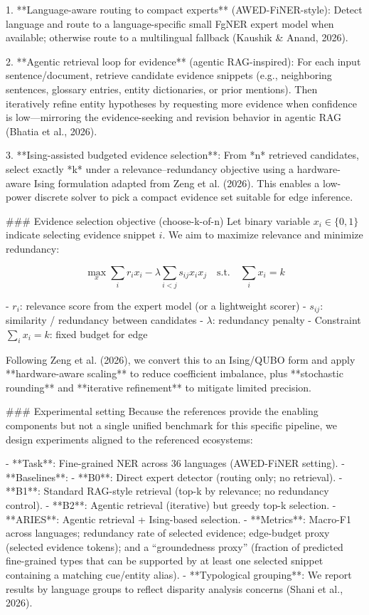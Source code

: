 1. **Language-aware routing to compact experts** (AWED-FiNER-style):  
   Detect language and route to a language-specific small FgNER expert model when available; otherwise route to a multilingual fallback (Kaushik & Anand, 2026).

2. **Agentic retrieval loop for evidence** (agentic RAG-inspired):  
   For each input sentence/document, retrieve candidate evidence snippets (e.g., neighboring sentences, glossary entries, entity dictionaries, or prior mentions). Then iteratively refine entity hypotheses by requesting more evidence when confidence is low—mirroring the evidence-seeking and revision behavior in agentic RAG (Bhatia et al., 2026).

3. **Ising-assisted budgeted evidence selection**:  
   From *n* retrieved candidates, select exactly *k* under a relevance–redundancy objective using a hardware-aware Ising formulation adapted from Zeng et al. (2026). This enables a low-power discrete solver to pick a compact evidence set suitable for edge inference.

### Evidence selection objective (choose-k-of-n)  
Let binary variable \(x_i \in \{0,1\}\) indicate selecting evidence snippet \(i\). We aim to maximize relevance and minimize redundancy:

\[
\max_{x} \sum_i r_i x_i - \lambda \sum_{i<j} s_{ij} x_i x_j
\quad \text{s.t.} \quad \sum_i x_i = k
\]

- \(r_i\): relevance score from the expert model (or a lightweight scorer)  
- \(s_{ij}\): similarity / redundancy between candidates  
- \(\lambda\): redundancy penalty  
- Constraint \(\sum_i x_i = k\): fixed budget for edge

Following Zeng et al. (2026), we convert this to an Ising/QUBO form and apply **hardware-aware scaling** to reduce coefficient imbalance, plus **stochastic rounding** and **iterative refinement** to mitigate limited precision.

### Experimental setting  
Because the references provide the enabling components but not a single unified benchmark for this specific pipeline, we design experiments aligned to the referenced ecosystems:

- **Task**: Fine-grained NER across 36 languages (AWED-FiNER setting).  
- **Baselines**:  
  - **B0**: Direct expert detector (routing only; no retrieval).  
  - **B1**: Standard RAG-style retrieval (top-k by relevance; no redundancy control).  
  - **B2**: Agentic retrieval (iterative) but greedy top-k selection.  
  - **ARIES**: Agentic retrieval + Ising-based selection.  
- **Metrics**: Macro-F1 across languages; redundancy rate of selected evidence; edge-budget proxy (selected evidence tokens); and a “groundedness proxy” (fraction of predicted fine-grained types that can be supported by at least one selected snippet containing a matching cue/entity alias).  
- **Typological grouping**: We report results by language groups to reflect disparity analysis concerns (Shani et al., 2026).

